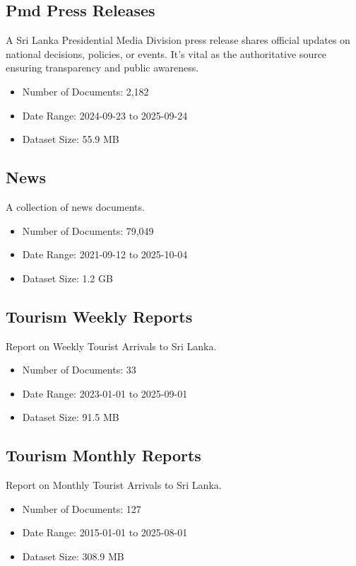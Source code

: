 \documentclass[10pt,a4paper]{article}%
\begin{document}
%
\subsection{Pmd Press Releases}%
\label{subsec:PmdPressReleases}%
A Sri Lanka Presidential Media Division press release shares official updates on national decisions, policies, or events. It’s vital as the authoritative source ensuring transparency and public awareness.%
\begin{itemize}%
\item%
Number of Documents: 2,182%
\item%
Date Range: 2024{-}09{-}23 to 2025{-}09{-}24%
\item%
Dataset Size: 55.9 MB%
\end{itemize}

%
\subsection{News}%
\label{subsec:News}%
A collection of news documents.%
\begin{itemize}%
\item%
Number of Documents: 79,049%
\item%
Date Range: 2021{-}09{-}12 to 2025{-}10{-}04%
\item%
Dataset Size: 1.2 GB%
\end{itemize}

%
\subsection{Tourism Weekly Reports}%
\label{subsec:TourismWeeklyReports}%
Report on Weekly Tourist Arrivals to Sri Lanka.%
\begin{itemize}%
\item%
Number of Documents: 33%
\item%
Date Range: 2023{-}01{-}01 to 2025{-}09{-}01%
\item%
Dataset Size: 91.5 MB%
\end{itemize}

%
\subsection{Tourism Monthly Reports}%
\label{subsec:TourismMonthlyReports}%
Report on Monthly Tourist Arrivals to Sri Lanka.%
\begin{itemize}%
\item%
Number of Documents: 127%
\item%
Date Range: 2015{-}01{-}01 to 2025{-}08{-}01%
\item%
Dataset Size: 308.9 MB%
\end{itemize}
\end{document}
